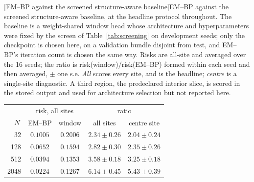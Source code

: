 
\begin{center}
\begin{minipage}{\linewidth}\small\centering
{}[EM--BP against the screened structure-aware baseline]{EM--BP against the screened structure-aware baseline, at the
headline protocol throughout. The baseline is a weight-shared window head whose
architecture and hyperparameters were fixed by the screen of
Table~\ref{tab:screening} on development seeds; only the checkpoint is chosen
here, on a validation bundle disjoint from test, and EM--BP's iteration count is
chosen the same way. Risks are all-site and averaged over the 16 seeds; the ratio is
risk(window)/risk(EM--BP) formed within each seed and then averaged, $\pm$ one
s.e. \emph{All} scores every site, and is the headline; \emph{centre} is a
single-site diagnostic. A third region, the predeclared interior slice, is scored
in the stored output and used for architecture selection but not reported here.}
\label{tab:structured}
\begin{tabular}{rcccc}
\toprule
 & \multicolumn{2}{c}{risk, all sites} & \multicolumn{2}{c}{ratio} \\
$N$ & EM--BP & window & all sites & centre site \\
\midrule
32   & $0.1005$ & $0.2006$ & $2.34 \pm 0.26$ & $2.04 \pm 0.24$ \\
128  & $0.0652$ & $0.1594$ & $2.82 \pm 0.30$ & $2.35 \pm 0.26$ \\
512  & $0.0394$ & $0.1353$ & $3.58 \pm 0.18$ & $3.25 \pm 0.18$ \\
2048 & $0.0224$ & $0.1267$ & $6.14 \pm 0.45$ & $5.43 \pm 0.39$ \\
\bottomrule
\end{tabular}
\end{minipage}
\end{center}
